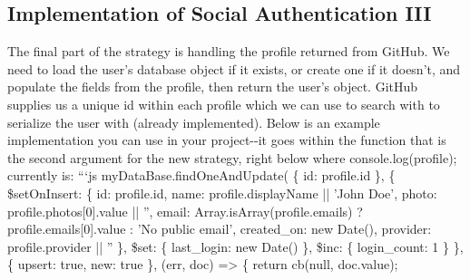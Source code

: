 \documentclass{article}%
\begin{document}
\subsection{Implementation of Social Authentication III}%
\label{subsec:ImplementationofSocialAuthenticationIII}%
The final part of the strategy is handling the profile returned from GitHub. We need to load the user's database object if it exists, or create one if it doesn't, and populate the fields from the profile, then return the user's object. GitHub supplies us a unique id within each profile which we can use to search with to serialize the user with (already implemented). Below is an example implementation you can use in your project{-}{-}it goes within the function that is the second argument for the new strategy, right below where console.log(profile); currently is:\newline%
```js\newline%
myDataBase.findOneAndUpdate(\newline%
  \{ id: profile.id \},\newline%
  \{\newline%
    \$setOnInsert: \{\newline%
      id: profile.id,\newline%
      name: profile.displayName || 'John Doe',\newline%
      photo: profile.photos{[}0{]}.value || '',\newline%
      email: Array.isArray(profile.emails)\newline%
        ? profile.emails{[}0{]}.value\newline%
        : 'No public email',\newline%
      created\_on: new Date(),\newline%
      provider: profile.provider || ''\newline%
    \},\newline%
    \$set: \{\newline%
      last\_login: new Date()\newline%
    \},\newline%
    \$inc: \{\newline%
      login\_count: 1\newline%
    \}\newline%
  \},\newline%
  \{ upsert: true, new: true \},\newline%
  (err, doc) => \{\newline%
    return cb(null, doc.value);\newline%
\end{document}
